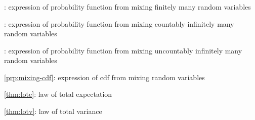 \subsubsection*{}
\item {}: expression of probability function from
mixing finitely many random variables
\item {}: expression of probability function from
mixing countably infinitely many random variables
\item {}: expression of probability function from
mixing uncountably infinitely many random variables
\item \cref{prp:mixing-cdf}: expression of cdf from mixing random variables
\item \cref{thm:lote}: law of total expectation
\item \cref{thm:lotv}: law of total variance
